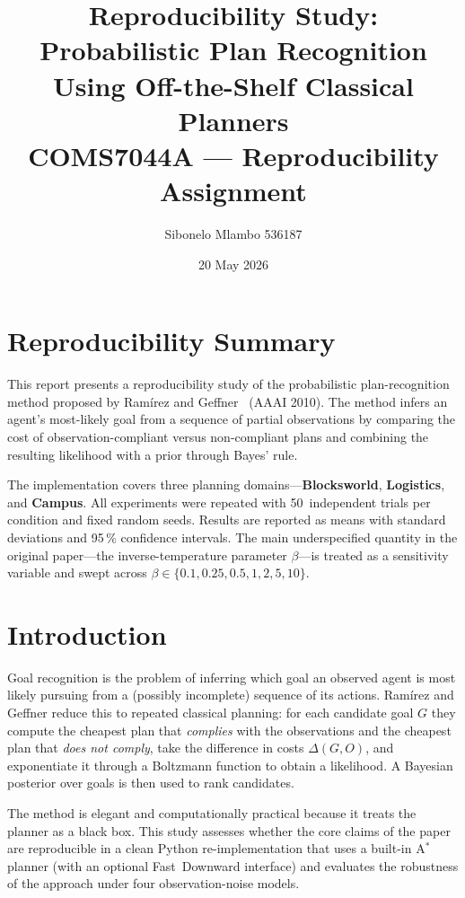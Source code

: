 \documentclass[11pt,a4paper]{article}
\title{\textbf{Reproducibility Study: Probabilistic Plan Recognition\\
Using Off-the-Shelf Classical Planners}\\[6pt]
\large COMS7044A --- Reproducibility Assignment}
\author{Sibonelo Mlambo 536187}
\date{20 May 2026}
\begin{document}
\maketitle
\tableofcontents
\clearpage

\section*{Reproducibility Summary}

This report presents a reproducibility study of the probabilistic plan-recognition
method proposed by Ram\'{i}rez and Geffner~\cite{ramirez2010} (AAAI 2010).
The method infers an agent's most-likely goal from a sequence of partial
observations by comparing the cost of observation-compliant versus
non-compliant plans and combining the resulting likelihood with a prior through
Bayes' rule.

The implementation covers three planning domains---\textbf{Blocksworld},
\textbf{Logistics}, and \textbf{Campus}.  All experiments were repeated with
50~independent trials per condition and fixed random seeds.  Results are
reported as means with standard deviations and 95\,\% confidence intervals.
The main underspecified quantity in the original paper---the inverse-temperature
parameter $\beta$---is treated as a sensitivity variable and swept across
$\beta \in \{0.1, 0.25, 0.5, 1, 2, 5, 10\}$.

\section{Introduction}

Goal recognition is the problem of inferring which goal an observed agent is
most likely pursuing from a (possibly incomplete) sequence of its actions.
Ram\'{i}rez and Geffner reduce this to repeated classical planning: for each
candidate goal $G$ they compute the cheapest plan that \emph{complies} with
the observations and the cheapest plan that \emph{does not comply}, take the
difference in costs $\Delta(G,O)$, and exponentiate it through a Boltzmann
function to obtain a likelihood.  A Bayesian posterior over goals is then used
to rank candidates.

The method is elegant and computationally practical because it treats the
planner as a black box.  This study assesses whether the core claims of the
paper are reproducible in a clean Python re-implementation that uses a
built-in A$^*$ planner (with an optional Fast~Downward interface) and evaluates
the robustness of the approach under four observation-noise models.
\end{document}
